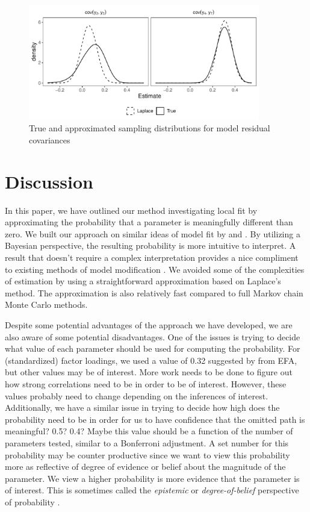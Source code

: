 \documentclass[noextraspace, floatsintext, 12pt]{apa7}
\begin{document}
\begin{figure}
\centering
\includegraphics[width=0.9\textwidth]{fig/sampling_dist}
\caption{True and approximated sampling distributions for model residual covariances}
\label{fig:dist}
\end{figure}


\section{Discussion}

In this paper, we have outlined our method investigating local fit by approximating the probability that a parameter is meaningfully different than zero.
We built our approach on similar ideas of model fit by \textcite{Lee2016} and \textcite{Shi2019}.
By utilizing a Bayesian perspective, the resulting probability is more intuitive to interpret.
A result that doesn't require a complex interpretation provides a nice compliment to existing methods of model modification \citep[e.g., ][]{Sorbom1989, Kaplan1989, Wald1943}.
We avoided some of the complexities of estimation by using a straightforward approximation based on Laplace's method.
The approximation is also relatively fast compared to full Markov chain Monte Carlo methods.

Despite some potential advantages of the approach we have developed, we are also aware of some potential disadvantages.
One of the issues is trying to decide what value of each parameter should be used for computing the probability. For (standardized) factor loadings, we used a value of 0.32 suggested by \textcite{Benson1998} from EFA, but other values may be of interest.
More work needs to be done to figure out how strong correlations need to be in order to be of interest.
However, these values probably need to change depending on the inferences of interest.
Additionally, we have a similar issue in trying to decide how high does the probability need to be in order for us to have confidence that the omitted path is meaningful? 0.5? 0.4? Maybe this value should be a function of the number of parameters tested, similar to a Bonferroni adjustment.
A set number for this probability may be counter productive since we want to view this probability more as reflective of degree of evidence or belief about the magnitude of the parameter.
We view a higher probability is more evidence that the parameter is of interest.
This is sometimes called the \textit{epistemic} or \textit{degree-of-belief} perspective of probability \citep[][, p.XX]{Levy2016, deFinetti1974}.
\end{document}
